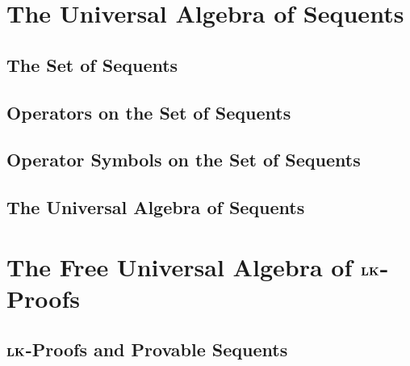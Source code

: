 \section{The Universal Algebra of Sequents}
    \subsection{The Set of Sequents}
        
    \subsection{Operators on the Set of Sequents}
        
    \subsection{Operator Symbols on the Set of Sequents}
        
    \subsection{The Universal Algebra of Sequents}
        
\section{The Free Universal Algebra of $\bf LK$-Proofs}
    \subsection{$\bf LK$-Proofs and Provable Sequents}
        



